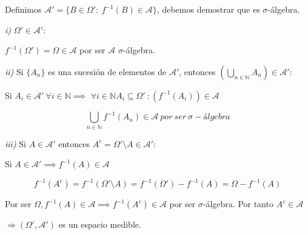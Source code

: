 
Definimos $\mathcal{A}'=\{ B\in\Omega ':\ f^{-1}(B)\in \mathcal{A} \}$, debemos demostrar que es $\sigma$-álgebra.

\textit{i)}
$\Omega ' \in \mathcal{A}'$:

$f^{-1}(\Omega ') = \Omega\in\mathcal{A}$ por ser $\mathcal{A}$ $\sigma$-álgebra.

\textit{ii)}
Si $\{A_n\}$ es una sucesión de elementos de $\mathcal{A}'$, entonces $\left( \bigcup_{n\in\mathbb{N}}A_n \right) \in \mathcal{A}'$:

Si $A_i\in \mathcal{A}' \ \forall       
 i\in\mathbb{N} \implies$
$\forall i\in\mathbb{N} A_i\subseteq\Omega '\ : \left( f^{-1}(A_i)\right) \in \mathcal{A}$

\[ \bigcup_{n \in \mathbb{N} }f^{-1}(A_n) \in \mathcal{A} \ por \ ser \ \sigma -álgebra\] 

\textit{iii)}
Si $A\in\mathcal{A}'$ entonces $A^c=\Omega '\setminus A \in \mathcal{A}'$:

Si $A\in \mathcal{A}' \implies f^{-1}(A)\in \mathcal{A}$

\[f^{-1}(A^c) = f^{-1}(\Omega'\setminus A) = f^{-1}(\Omega') - f^{-1}(A) = \Omega - f^{-1}(A) \]

Por ser $\Omega , f^{-1}(A)\in \mathcal{A} \implies f^{-1}(A^c)\in \mathcal{A}$ por ser $\sigma$-álgebra. Por tanto $A^c\in \mathcal{A}$

$\Longrightarrow (\Omega', \mathcal{A}')$ es un espacio medible. 